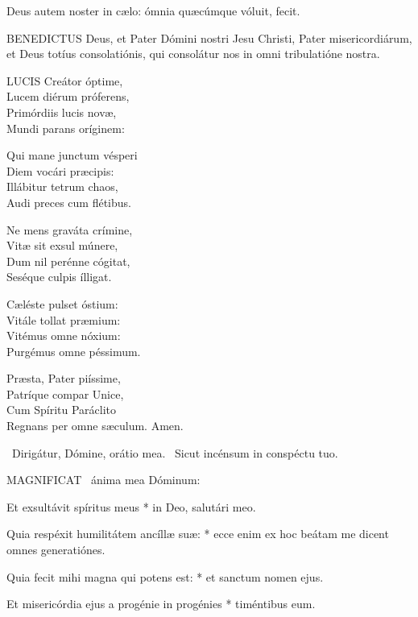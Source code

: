  Deus autem noster in cælo: ómnia quæcúmque vóluit, fecit.


\lettrine[lines=2]{B}{ENEDICTUS} Deus, et Pater Dómini nostri Jesu Christi, Pater misericordiárum, et Deus totíus consolatiónis, qui consolátur nos in omni tribulatióne nostra.


\lettrine[lines=2]{L}{UCIS} Creátor óptime,\\
Lucem diérum próferens,\\
Primórdiis lucis novæ,\\
Mundi parans oríginem:

Qui mane junctum vésperi\\
Diem vocári præcipis:\\
Illábitur tetrum chaos,\\
Audi preces cum flétibus.

Ne mens graváta crímine,\\
Vitæ sit exsul múnere,\\
Dum nil perénne cógitat,\\
Seséque culpis ílligat.

Cæléste pulset óstium:\\
Vitále tollat præmium:\\
Vitémus omne nóxium:\\
Purgémus omne péssimum.

Præsta, Pater piíssime,\\
Patríque compar Unice,\\
Cum Spíritu Paráclito\\
Regnans per omne sæculum. Amen.

\V\ Dirigátur, Dómine, orátio mea. \R\ Sicut incénsum in conspéctu tuo.



\lettrine[lines=2]{M}{AGNIFICAT} \textdagger\ ánima mea Dóminum:

Et exsultávit spíritus meus * in Deo, salutári meo.

Quia respéxit humilitátem ancíllæ suæ: * ecce enim ex hoc beátam me dicent omnes generatiónes.

Quia fecit mihi magna qui potens est: * et sanctum nomen ejus.

Et misericórdia ejus a progénie in progénies * timéntibus eum.

